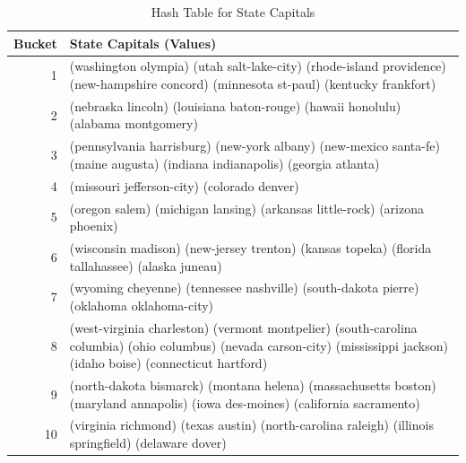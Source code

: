 \begin{table}
\begin{center}
\begin{tabular}{r|p{4in}}
\textbf{Bucket} & \textbf{State Capitals (Values)} \\
\hline
1 & (washington  olympia)  (utah  salt-lake-city)  \hfill\break (rhode-island  providence)  (new-hampshire  concord)  \hfill\break (minnesota  st-paul)  (kentucky  frankfort) \\
\hline
2 & (nebraska  lincoln) (louisiana  baton-rouge) \hfill\break  (hawaii  honolulu)  (alabama  montgomery) \\
\hline
3 & (pennsylvania  harrisburg)  (new-york  albany) \hfill\break  (new-mexico  santa-fe)  (maine  augusta) \hfill\break  (indiana  indianapolis)  (georgia  atlanta) \\
\hline
4 & (missouri  jefferson-city)  (colorado  denver) \\
\hline
5 & (oregon  salem)  (michigan  lansing) \hfill\break  (arkansas  little-rock)  (arizona  phoenix) \\
\hline
6 & (wisconsin  madison)  (new-jersey  trenton) \hfill\break  (kansas  topeka)  (florida  tallahassee) \hfill\break  (alaska  juneau) \\
\hline
7 & (wyoming  cheyenne)  (tennessee  nashville) \hfill\break  (south-dakota  pierre)  (oklahoma  oklahoma-city) \\
\hline
8 & (west-virginia  charleston)  (vermont  montpelier) \hfill\break  (south-carolina  columbia)  (ohio  columbus) \hfill\break  (nevada  carson-city)  (mississippi  jackson)  (idaho  boise)  (connecticut  hartford) \\
\hline
9 & (north-dakota  bismarck)  (montana  helena) \hfill\break  (massachusetts  boston)  (maryland  annapolis) \hfill\break  (iowa  des-moines)  (california  sacramento) \\
\hline
10 & (virginia  richmond)  (texas  austin) \hfill\break  (north-carolina  raleigh) \hfill\break  (illinois  springfield)  (delaware  dover) \\
\end{tabular}
\end{center}
\caption{Hash Table for State Capitals}
\label{table:hash-table-state-capitals}
\end{table}

